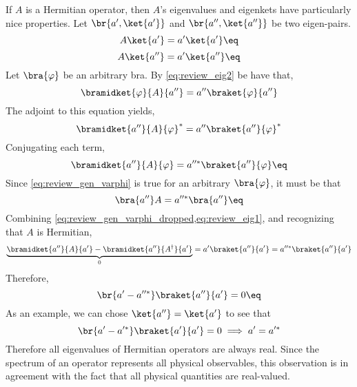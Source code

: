 \documentclass{article}
\begin{document}
If $A$ is a Hermitian operator, then $A$'s eigenvalues and eigenkets have particularly nice properties. Let $\br{a', \ket{a'}}$ and $\br{a'', \ket{a''}}$ be two eigen-pairs.
\[ A \ket{a'} = a' \ket{a'} \eq \label{eq:review_eig1}\]
\[ A \ket{a''} = a' \ket{a''} \eq \label{eq:review_eig2} \]
Let $\bra{\varphi}$ be an arbitrary bra. By \cref{eq:review_eig2} be have that,
\[ \bramidket{\varphi}{A}{a''} = a'' \braket{\varphi}{a''} \]
The adjoint to this equation yields,
\[ \bramidket{a''}{A}{\varphi}^{*} = a'' \braket{a''}{\varphi}^{*} \]
Conjugating each term,
\[ \bramidket{a''}{A}{\varphi} = a''^{*} \braket{a''}{\varphi} \eq \label{eq:review_gen_varphi}\]
Since \cref{eq:review_gen_varphi} is true for an arbitrary $\bra{\varphi}$, it must be that
\[ \bra{a''}A = a''^{*} \bra{a''} \eq \label{eq:review_gen_varphi_dropped} \]
Combining \cref{eq:review_gen_varphi_dropped,eq:review_eig1}, and recognizing that $A$ is Hermitian,
\[ \underbrace{\bramidket{a''}{A}{a'} - \bramidket{a''}{A^\dagger}{a'}}_{0} = a' \braket{a''}{a'} = a''^{*} \braket{a''}{a'} \]
Therefore,
\[ \br{a' - a''^{*}}\braket{a''}{a'} = 0 \eq \label{eq:review_aa}\]
As an example, we can chose $\ket{a''} = \ket{a'}$ to see that
\[ \br{a' - a'^{*}}\braket{a'}{a'} = 0 \implies a' = a'^{*}\]
Therefore all eigenvalues of Hermitian operators are always real. Since the spectrum of an operator represents all physical observables, this observation is in agreement with the fact that all physical quantities are real-valued. \\
\end{document}
